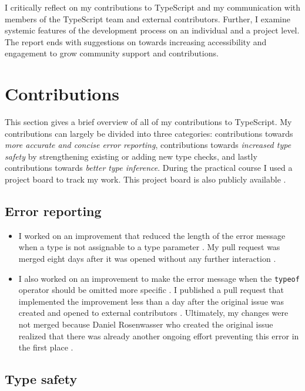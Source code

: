 \documentclass[12pt]{scrartcl}
\def\code#1{\texttt{\frenchspacing#1}}
\let\oldsection\section
\renewcommand\section{\clearpage\oldsection}
\begin{document}
I critically reflect on my contributions to TypeScript and my communication with members of the TypeScript team and external contributors. Further, I examine systemic features of the development process on an individual and a project level. The report ends with suggestions on towards increasing accessibility and engagement to grow community support and contributions.

\section{Contributions}

This section gives a brief overview of all of my contributions to TypeScript. My contributions can largely be divided into three categories: contributions towards \textit{more accurate and concise error reporting}, contributions towards \textit{increased type safety} by strengthening existing or adding new type checks, and lastly contributions towards \textit{better type inference}. During the practical course I used a project board to track my work. This project board is also publicly available \cite{ProjectBoard}.

\subsection{Error reporting}

\begin{itemize}
    \item I worked on an improvement that reduced the length of the error message when a type is not assignable to a type parameter \cite{42849}. My pull request was merged eight days after it was opened without any further interaction \cite{42952}.
    \item I also worked on an improvement to make the error message when the \code{typeof} operator should be omitted more specific \cite{42523}. I published a pull request that implemented the improvement less than a day after the original issue was created and opened to external contributors \cite{42530}. Ultimately, my changes were not merged because Daniel Rosenwasser who created the original issue realized that there was already another ongoing effort preventing this error in the first place \cite{42530Comment}.
\end{itemize}

\subsection{Type safety}
\end{document}
